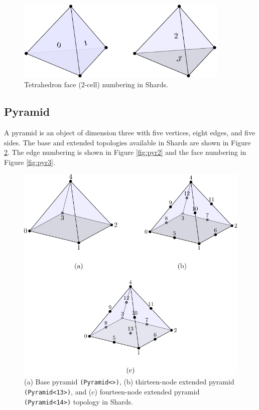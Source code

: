 \documentclass[pdf,12pt,relaxed]{SANDreport}
\begin{document}
\begin{figure}[ht]
 \begin{center}
    \includegraphics[width=4.0in]{topo_figs/tet_face.pdf}
 \end{center}
 \caption{Tetrahedron face (2-cell) numbering in Shards.}
 \label{fig:tet3}
\end{figure}


\subsection{Pyramid}
A pyramid is an object of dimension three with five vertices, eight edges, and five sides. The base and extended topologies available in Shards are shown in Figure \ref{fig:pyr1}. The edge numbering is shown in Figure \ref{fig:pyr2} and the face numbering in Figure \ref{fig:pyr3}.

\begin{figure}[ht]
 \begin{center}
    \includegraphics[width=4.5in]{topo_figs/pyr_node.pdf}
 \end{center}
  \caption{(a) Base pyramid {\tt (Pyramid<>)}, (b) thirteen-node extended pyramid {\tt (Pyramid<13>)}, and (c) fourteen-node extended pyramid {\tt (Pyramid<14>)} topology in Shards.}
 \label{fig:pyr1}
\end{figure}
\end{document}
